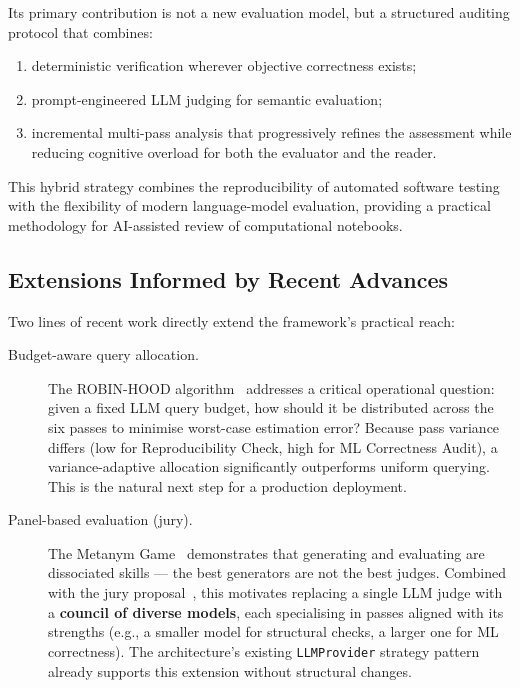 \documentclass[11pt, a4paper]{article}
\begin{document}
Its primary contribution is not a new evaluation model, but a structured
auditing protocol that combines:
\begin{enumerate}
  \item deterministic verification wherever objective correctness exists;
  \item prompt-engineered LLM judging for semantic evaluation;
  \item incremental multi-pass analysis that progressively refines the
    assessment while reducing cognitive overload for both the evaluator and
    the reader.
\end{enumerate}

This hybrid strategy combines the reproducibility of automated software
testing with the flexibility of modern language-model evaluation, providing a
practical methodology for AI-assisted review of computational notebooks.

\subsection*{Extensions Informed by Recent Advances}

Two lines of recent work directly extend the framework's practical reach:

\begin{description}
  \item[Budget-aware query allocation.] The ROBIN-HOOD
    algorithm~\cite{saha2026robinhood} addresses a critical operational
    question: given a fixed LLM query budget, how should it be distributed
    across the six passes to minimise worst-case estimation error? Because
    pass variance differs (low for Reproducibility Check, high for ML
    Correctness Audit), a variance-adaptive allocation significantly
    outperforms uniform querying. This is the natural next step for a
    production deployment.

  \item[Panel-based evaluation (jury).] The Metanym
    Game~\cite{nordfors2026metanym} demonstrates that generating and
    evaluating are dissociated skills --- the best generators are not the
    best judges. Combined with the jury proposal~\cite{verga2024juries}, this
    motivates replacing a single LLM judge with a \textbf{council of diverse
    models}, each specialising in passes aligned with its strengths (e.g., a
    smaller model for structural checks, a larger one for ML correctness).
    The architecture's existing \texttt{LLMProvider} strategy pattern already
    supports this extension without structural changes.
\end{description}
\end{document}
